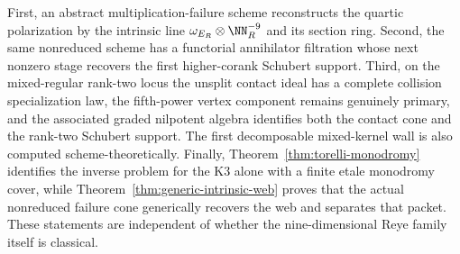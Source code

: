 First, an abstract multiplication-failure scheme reconstructs the
quartic polarization by the intrinsic line
$\omega_{E_R}\otimes\NN_R^{-9}$ and its section ring.  Second, the
same nonreduced scheme has a functorial annihilator filtration whose
next nonzero stage recovers the first higher-corank Schubert support.
Third, on the mixed-regular rank-two locus the unsplit contact ideal
has a complete collision specialization law, the fifth-power vertex
component remains genuinely primary, and the associated graded
nilpotent algebra identifies both the contact cone and the rank-two
Schubert support.  The first decomposable mixed-kernel wall is also
computed scheme-theoretically.  Finally,
Theorem~\ref{thm:torelli-monodromy} identifies the inverse problem
for the K3 alone with a finite etale monodromy cover, while
Theorem~\ref{thm:generic-intrinsic-web} proves that the actual
nonreduced failure cone generically recovers the web and separates
that packet.  These statements are
independent of whether the nine-dimensional Reye family itself is
classical.


